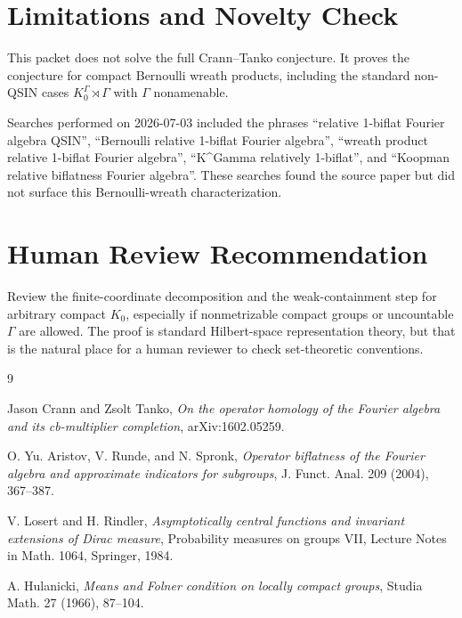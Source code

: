 \documentclass[11pt]{article}
\begin{document}
\section*{Limitations and Novelty Check}

This packet does not solve the full Crann--Tanko conjecture. It proves
the conjecture for compact Bernoulli wreath products, including the
standard non-QSIN cases \(K_0^\Gamma\rtimes\Gamma\) with \(\Gamma\)
nonamenable.

Searches performed on 2026-07-03 included the phrases
``relative 1-biflat Fourier algebra QSIN'', ``Bernoulli relative
1-biflat Fourier algebra'', ``wreath product relative 1-biflat Fourier
algebra'', ``K\^{}Gamma relatively 1-biflat'', and ``Koopman relative
biflatness Fourier algebra''. These searches found the source paper but
did not surface this Bernoulli-wreath characterization.

\section*{Human Review Recommendation}

Review the finite-coordinate decomposition and the weak-containment step
for arbitrary compact \(K_0\), especially if nonmetrizable compact groups
or uncountable \(\Gamma\) are allowed. The proof is standard Hilbert-space
representation theory, but that is the natural place for a human reviewer
to check set-theoretic conventions.

\begin{thebibliography}{9}

Jason Crann and Zsolt Tanko,
\emph{On the operator homology of the Fourier algebra and its cb-multiplier completion},
arXiv:1602.05259.

O. Yu. Aristov, V. Runde, and N. Spronk,
\emph{Operator biflatness of the Fourier algebra and approximate indicators for subgroups},
J. Funct. Anal. 209 (2004), 367--387.

V. Losert and H. Rindler,
\emph{Asymptotically central functions and invariant extensions of Dirac measure},
Probability measures on groups VII, Lecture Notes in Math. 1064, Springer, 1984.

A. Hulanicki,
\emph{Means and Folner condition on locally compact groups},
Studia Math. 27 (1966), 87--104.

\end{thebibliography}
\end{document}
